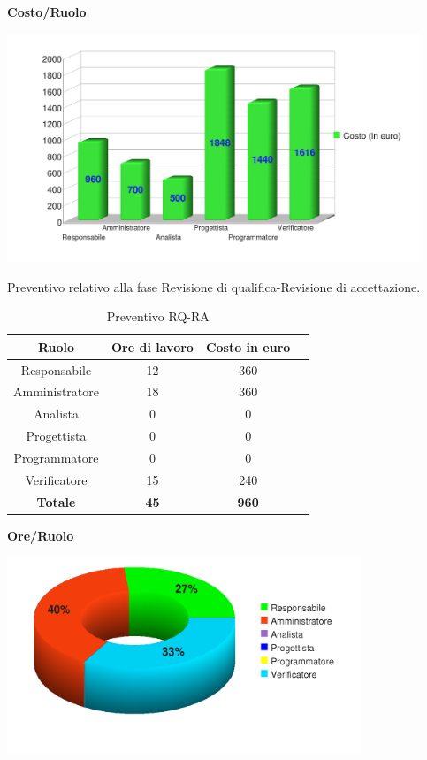 \begin{center}\textbf{Costo/Ruolo}
\end{center}
\includegraphics[width=350pt]{RPP-RQ_Costi}

\newpage

Preventivo relativo alla fase Revisione di qualifica-Revisione di accettazione.
\begin{table}[h]
	\begin{center}
		  \begin{tabular}{|c|c|c|c|}
		 \hline 
		 \textbf{Ruolo} & \textbf{Ore di lavoro} & \textbf{Costo in euro}\\
		 \hline
		Responsabile & 12 & 360 \\
		Amministratore & 18 & 360\\
		Analista & 0 & 0\\
		Progettista & 0 & 0\\
		Programmatore & 0 & 0 \\
		Verificatore & 15 & 240\\
        \hline
        \textbf{Totale} & \textbf{45} & \textbf{960}\\
		\hline
		\end{tabular}
	\caption{Preventivo RQ-RA} 
	\label{tab:tabella_RQ-RA}
	\end{center}	
\end{table}



\begin{center}\textbf{Ore/Ruolo}
\end{center}
\includegraphics[width=300pt]{RQ-RA_Ore}

